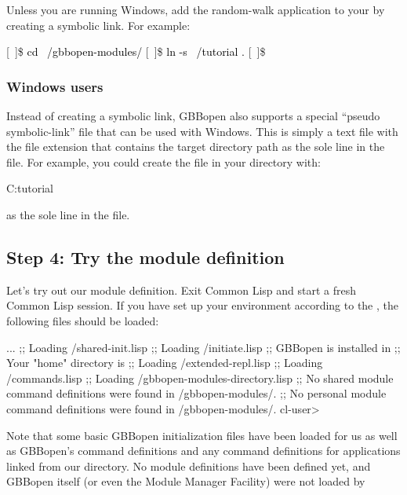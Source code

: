 \documentclass[10pt,twoside,english,pdftex]{article}
\begin{document}
Unless you are running Windows, add the random-walk application to your
 by creating a symbolic link.  For example:
%
\W\supp
\begin{example}
\textcolor{darkergray}{%
  [~]\$ \textcolor{black}{cd ~/gbbopen-modules/}
  [~]\$ \textcolor{black}{ln -s ~/tutorial .}
  [~]\$}
\end{example}

\subsubsection*{Windows users}

Instead of creating a symbolic link, GBBopen also supports a special ``pseudo
symbolic-link'' file that can be used with Windows.  This is simply a text
file with the file extension  that contains the target directory
path as the sole line in the file.  For example, you could create the file
 in your  directory
with:
%
\W\supp
\begin{example}
  C:\bkslash{}tutorial\bkslash
\end{example}
\T\vskip -12pt
%
as the sole line in the file.

\subsection*{Step 4: Try the  module definition}

Let's try out our module definition.  Exit Common Lisp and start a fresh
Common Lisp session.  If you have set up your environment according to the
,
the following files should be loaded:
%
\W\supp
\begin{example}
\textcolor{darkergray}{%
     ...
  ;; Loading /shared-init.lisp
  ;;   Loading /initiate.lisp
  ;; GBBopen is installed in 
  ;; Your "home" directory is 
  ;;     Loading /extended-repl.lisp
  ;;     Loading /commands.lisp
  ;;     Loading /gbbopen-modules-directory.lisp
  ;; No shared module command definitions were found in /gbbopen-modules/.
  ;; No personal module command definitions were found in /gbbopen-modules/.
 cl-user>}
\end{example}

Note that some basic GBBopen initialization files have been loaded for us as
well as GBBopen's command definitions and any command definitions for
applications linked from our 
directory. No module definitions have been defined yet, and GBBopen itself (or
even the Module Manager Facility) were not loaded by
\end{document}

